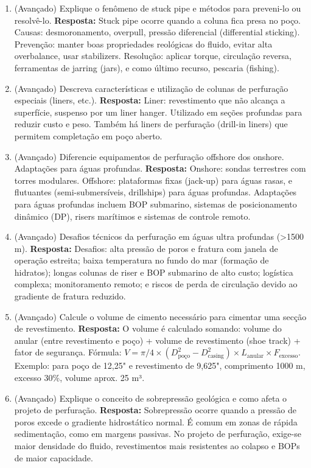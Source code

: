 \documentclass[11pt,a4paper]{article}
\begin{document}
\begin{enumerate}
  \item (Avançado) Explique o fenômeno de stuck pipe e métodos para preveni-lo ou resolvê-lo.
  \textbf{Resposta:} Stuck pipe ocorre quando a coluna fica presa no poço. Causas: desmoronamento, overpull, pressão diferencial (differential sticking). Prevenção: manter boas propriedades reológicas do fluido, evitar alta overbalance, usar stabilizers. Resolução: aplicar torque, circulação reversa, ferramentas de jarring (jars), e como último recurso, pescaria (fishing).

  \item (Avançado) Descreva características e utilização de colunas de perfuração especiais (liners, etc.).
  \textbf{Resposta:} Liner: revestimento que não alcança a superfície, suspenso por um liner hanger. Utilizado em seções profundas para reduzir custo e peso. Também há liners de perfuração (drill-in liners) que permitem completação em poço aberto.

  \item (Avançado) Diferencie equipamentos de perfuração offshore dos onshore. Adaptações para águas profundas.
  \textbf{Resposta:} Onshore: sondas terrestres com torres modulares. Offshore: plataformas fixas (jack-up) para águas rasas, e flutuantes (semi-submersíveis, drillships) para águas profundas. Adaptações para águas profundas incluem BOP submarino, sistemas de posicionamento dinâmico (DP), risers marítimos e sistemas de controle remoto.

  \item (Avançado) Desafios técnicos da perfuração em águas ultra profundas (>1500 m).
  \textbf{Resposta:} Desafios: alta pressão de poros e fratura com janela de operação estreita; baixa temperatura no fundo do mar (formação de hidratos); longas colunas de riser e BOP submarino de alto custo; logística complexa; monitoramento remoto; e riscos de perda de circulação devido ao gradiente de fratura reduzido.

  \item (Avançado) Calcule o volume de cimento necessário para cimentar uma secção de revestimento.
  \textbf{Resposta:} O volume é calculado somando: volume do anular (entre revestimento e poço) + volume de revestimento (shoe track) + fator de segurança. Fórmula: $V = \pi/4 \times (D_{\text{poço}}^2 - D_{\text{casing}}^2) \times L_{\text{anular}} \times F_{\text{excesso}}$. Exemplo: para poço de 12,25" e revestimento de 9,625", comprimento 1000 m, excesso 30\%, volume aprox. 25 m³.

  \item (Avançado) Explique o conceito de sobrepressão geológica e como afeta o projeto de perfuração.
  \textbf{Resposta:} Sobrepressão ocorre quando a pressão de poros excede o gradiente hidrostático normal. É comum em zonas de rápida sedimentação, como em margens passivas. No projeto de perfuração, exige-se maior densidade do fluido, revestimentos mais resistentes ao colapso e BOPs de maior capacidade.


\end{enumerate}
\end{document}
